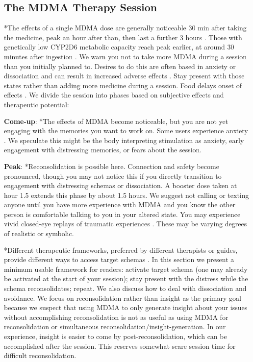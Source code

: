 \documentclass[12pt,letterpaper]{book}
\begin{document}
\subsection{The MDMA Therapy Session}
\label{session}
*The effects of a single MDMA dose are generally noticeable 30 min after taking the medicine, peak an hour after than, then last a further 3 hours \cite{vizeliActuteEffects}. Those with genetically low CYP2D6 metabolic capacity reach peak earlier, at around 30 minutes after ingestion \cite{schmid2016cyp2d6}. We warn you not to take more MDMA during a session than you initially planned to. Desires to do this are often based in anxiety or dissociation and can result in increased adverse effects \cite{bruntLinking}. Stay present with those states rather than adding more medicine during a session. Food delays onset of effects \cite{MithoeferMDMA}. We divide the session into phases based on subjective effects and therapeutic potential:

\textbf{Come-up}:
*The effects of MDMA become noticeable, but you are not yet engaging with the memories you want to work on. Some users experience anxiety \cite{hillsSolo}. We speculate this might be the body interpreting stimulation as anxiety, early engagement with distressing memories, or fears about the session.

\textbf{Peak}:
*Reconsolidation is possible here. Connection and safety become pronounced, though you may not notice this if you directly transition to engagement with distressing schemas or dissociation. A booster dose taken at hour 1.5 extends this phase by about 1.5 hours. We suggest not calling or texting anyone until you have more experience with MDMA and you know the other person is comfortable talking to you in your altered state. You may experience vivid closed-eye replays of traumatic experiences \cite{liechtiGender}. These may be varying degrees of realistic or symbolic.

*Different therapeutic frameworks, preferred by different therapists or guides, provide different ways to access target schemas \cite{eckerUnlocking}. In this section we present a minimum usable framework for readers: activate target schema (one may already be activated at the start of your session); stay present with the distress while the schema reconsolidates; repeat. We also discuss how to deal with dissociation and avoidance. We focus on reconsolidation rather than insight as the primary goal because we suspect that using MDMA to only generate insight about your issues without accomplishing reconsolidation is not as useful as using MDMA for reconsolidation or simultaneous reconsolidation/insight-generation. In our experience, insight is easier to come by post-reconsolidation, which can be accomplished after the session. This reserves somewhat scare session time for difficult reconsolidation.
\end{document}
